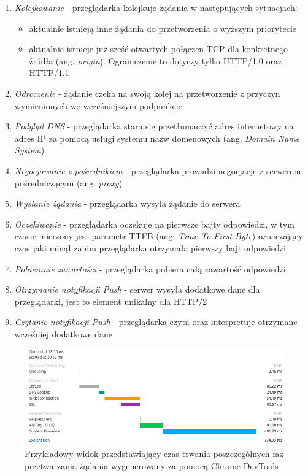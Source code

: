 \documentclass[polish, twoside, 12pt]{mwart}
\begin{document}
\begin{enumerate}
  \item \emph{Kolejkowanie} - przeglądarka kolejkuje żądania w następujących sytuacjach:
    \begin{itemize}
      \item aktualnie istnieją inne żądania do przetworzenia o wyższym priorytecie
      \item aktualnie istnieje już sześć otwartych połączen TCP dla konkretnego źródła (ang. \emph{origin}). Ograniczenie to dotyczy tylko HTTP/1.0 oraz HTTP/1.1
    \end{itemize}
  \item \emph{Odroczenie} - żądanie czeka na swoją kolej na przetworzenie z przyczyn wymienionych we wcześniejszym podpunkcie
  \item \emph{Podgląd DNS} - przeglądarka stara się przetłumaczyć adres internetowy na adres IP za pomocą usługi systemu nazw domenowych (ang. \emph{Domain Name System})
  \item \emph{Negocjowanie z pośrednikiem} - przeglądarka prowadzi negocjacje z serwerem pośredniczącym (ang. \emph{proxy})
  \item \emph{Wysłanie żądania} - przeglądarka wysyła żądanie do serwera
  \item \emph{Oczekiwanie} - przeglądarka oczekuje na pierwsze bajty odpowiedzi, w tym czasie mierzony jest parametr TTFB (ang. \emph{Time To First Byte}) oznaczający czas jaki minął zanim przeglądarka otrzymała pierwszy bajt odpowiedzi
  \item \emph{Pobieranie zawartości} - przeglądarka pobiera całą zawartość odpowiedzi
  \item \emph{Otrzymanie notyfikacji Push} - serwer wysyła dodatkowe dane dla przeglądarki, jest to element unikalny dla HTTP/2
  \item \emph{Czytanie notyfikacji Push} - przeglądarka czyta oraz interpretuje otrzymane wcześniej dodatkowe dane
\end{enumerate}

\begin{figure}[ht]
  \includegraphics[width=\textwidth]{request-timing-chrome.png}
	\caption{Przykładowy widok przedstawiający czas trwania poszczególnych faz przetwarzania żądania wygenerowany za pomocą Chrome DevTools}
\end{figure}
\end{document}
